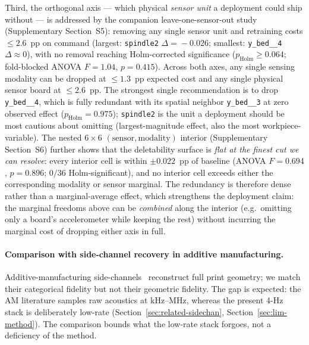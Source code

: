 \documentclass[sensors,article,submit,moreauthors,pdftex]{Definitions/mdpi}
\begin{document}
Third, the orthogonal axis --- which physical \emph{sensor unit} a deployment could ship without --- is addressed by the companion leave-one-sensor-out study (Supplementary Section~S5): removing any single sensor unit and retraining costs $\le\!2.6$~pp on command (largest: \texttt{spindle2} $\Delta\!=\!-0.026$; smallest: \texttt{y\_bed\_\_4} $\Delta\!\approx\!0$), with no removal reaching Holm-corrected significance ($p_{\text{Holm}}\!\ge\!0.064$; fold-blocked ANOVA $F\!=\!1.04$, $p\!=\!0.415$). Across both axes, any single sensing modality can be dropped at $\le\!1.3$~pp expected cost and any single physical sensor board at $\le\!2.6$~pp. The strongest single recommendation is to drop \texttt{y\_bed\_\_4}, which is fully redundant with its spatial neighbor \texttt{y\_bed\_\_3} at zero observed effect ($p_{\text{Holm}}\!=\!0.975$); \texttt{spindle2} is the unit a deployment should be most cautious about omitting (largest-magnitude effect, also the most workpiece-variable). The nested $6\!\times\!6$ $(\text{sensor},\text{modality})$ interior (Supplementary Section~S6) further shows that the deletability surface is \emph{flat at the finest cut we can resolve}: every interior cell is within $\pm 0.022$~pp of baseline (ANOVA $F\!=\!0.694$, $p\!=\!0.896$; $0/36$ Holm-significant), and no interior cell exceeds either the corresponding modality or sensor marginal. The redundancy is therefore dense rather than a marginal-average effect, which strengthens the deployment claim: the marginal freedoms above can be \emph{combined} along the interior (e.g.\ omitting only a board's accelerometer while keeping the rest) without incurring the marginal cost of dropping either axis in full.

\paragraph{Comparison with side-channel recovery in additive manufacturing.}\label{sec:disc-comparison-am}\hspace*{0pt plus 1fill}

Additive-manufacturing side-channels~\cite{alfaruque2016acoustic,song2016my,chhetri2016kcad,jamarani2024screg,chattopadhyay2025video} reconstruct full print geometry; we match their categorical fidelity but not their geometric fidelity. The gap is expected: the AM literature samples raw acoustics at kHz--MHz, whereas the present 4-Hz stack is deliberately low-rate (Section~\ref{sec:related-sidechan}, Section~\ref{sec:lim-method}). The comparison bounds what the low-rate stack forgoes, not a deficiency of the method.
\end{document}

